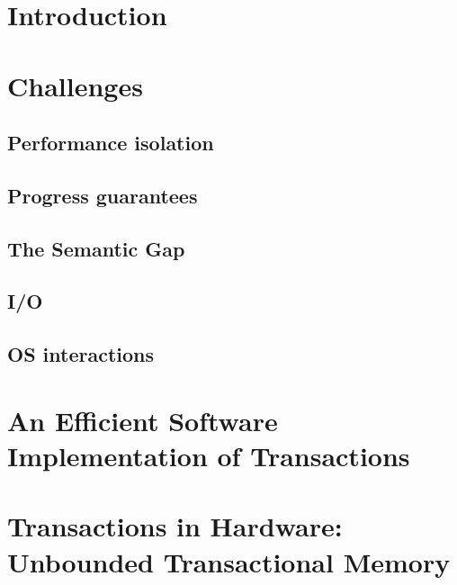\documentclass{phd-thesis}
\author{C. Scott Ananian}
\title{\subtitle}
\date{\subdate \\ $ $Revision: 1.14 $ $}
\newcommand{\note}[1]{}%
\begin{document}

\frontmatter


\mainmatter
\chapter{Introduction}


\chapter{Challenges}
\section{Performance isolation}
\note{Cite WDDD here.}
\section{Progress guarantees}\label{sec:progress}
\section{The Semantic Gap}\label{sec:semantic}
\section{I/O}
\section{OS interactions}

\chapter[Efficient Software Implementation]{An Efficient Software Implementation of Transactions}\label{sec:softimpl}


\chapter[Transactions in Hardware]{Transactions in Hardware: Unbounded Transactional Memory}\label{sec:hardimpl}
\end{document}

